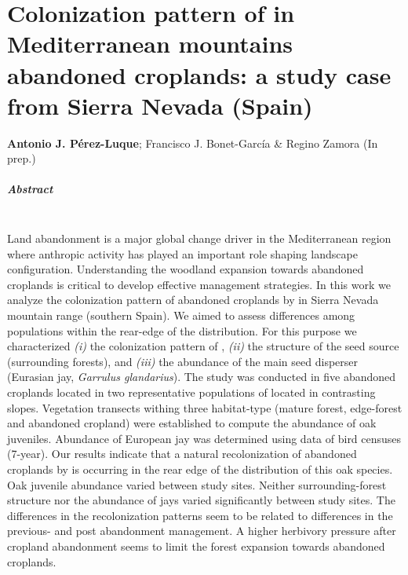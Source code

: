 %
\chapter{\textcolor{ctcolormain}{Colonization pattern of \Qp in Mediterranean mountains abandoned croplands: a study case from Sierra Nevada (Spain)}}\label{sec:coloniza}


\mbox{}
\vfill
{\color{ctcolormain}\textbf{Antonio J. Pérez-Luque}}; Francisco J. Bonet-García \& Regino Zamora (In prep.)


\newpage

\paragraph{Abstract} \mbox{} \\
Land abandonment is a major global change driver in the Mediterranean region where anthropic activity has played an important role shaping landscape configuration. Understanding the woodland expansion towards abandoned croplands is critical to develop effective management strategies. In this work we analyze the colonization pattern of abandoned croplands by \Qpy in Sierra Nevada mountain range (southern Spain). We aimed to assess differences among populations within the rear-edge of the \Qp distribution. For this purpose we characterized \emph{(i)} the colonization pattern of \Qp, \emph{(ii)} the structure of the seed source (surrounding forests), and \emph{(iii)} the abundance of the main seed disperser (Eurasian jay, \emph{Garrulus glandarius}). The study was conducted in five abandoned croplands located in two representative populations of \Qp located in contrasting slopes. Vegetation transects withing three habitat-type (mature forest, edge-forest and abandoned cropland) were established to compute the abundance of oak juveniles. Abundance of European jay was determined using data of bird censuses (7-year). Our results indicate that a natural recolonization of abandoned croplands by \Qp is occurring in the rear edge of the distribution of this oak species. Oak juvenile abundance varied between study sites. Neither surrounding-forest structure nor the abundance of jays varied significantly between study sites. The differences in the recolonization patterns seem to be related to differences in the previous- and post abandonment management. A higher herbivory pressure after cropland abandonment seems to limit the forest expansion towards abandoned croplands.
\newpage

